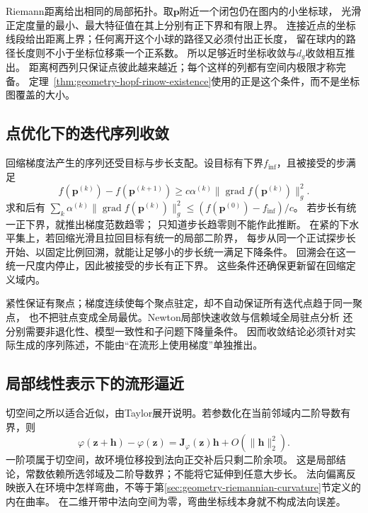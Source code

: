 Riemann距离给出相同的局部拓扑。取$\bm p$附近一个闭包仍在图内的小坐标球，
光滑正定度量的最小、最大特征值在其上分别有正下界和有限上界。
连接近点的坐标线段给出距离上界；任何离开这个小球的路径又必须付出正长度，
留在球内的路径长度则不小于坐标位移乘一个正系数。
所以足够近时坐标收敛与$d_g$收敛相互推出。
距离柯西列只保证点彼此越来越近；每个这样的列都有空间内极限才称完备。
定理~\ref{thm:geometry-hopf-rinow-existence}使用的正是这个条件，而不是坐标图覆盖的大小。

\subsection{点优化下的迭代序列收敛}
\label{sec:geometry-point-iteration-convergence}

回缩梯度法产生的序列还受目标与步长支配。设目标有下界$f_{\inf}$，且被接受的步满足
\[
 f(\bm p^{(k)})-f(\bm p^{(k+1)})\geq
 c\alpha^{(k)}\lVert\operatorname{grad}f(\bm p^{(k)})\rVert_g^2.
\]
求和后有
$\sum_k\alpha^{(k)}\lVert\operatorname{grad}f(\bm p^{(k)})\rVert_g^2
\leq(f(\bm p^{(0)})-f_{\inf})/c$。
若步长有统一正下界，就推出梯度范数趋零；
只知道步长趋零则不能作此推断。
在紧的下水平集上，若回缩光滑且拉回目标有统一的局部二阶界，
每步从同一个正试探步长开始、以固定比例回溯，就能让足够小的步长统一满足下降条件。
回溯会在这一统一尺度内停止，因此被接受的步长有正下界。
这些条件还确保更新留在回缩定义域内。

紧性保证有聚点；梯度连续使每个聚点驻定，却不自动保证所有迭代点趋于同一聚点，
也不把驻点变成全局最优。Newton局部快速收敛与信赖域全局驻点分析
还分别需要非退化性、模型一致性和子问题下降量条件。
因而收敛结论必须针对实际生成的序列陈述，不能由“在流形上使用梯度”单独推出。

\subsection{局部线性表示下的流形逼近}
\label{sec:geometry-local-linear-approximation}

切空间之所以适合近似，由Taylor展开说明。若参数化在当前邻域内二阶导数有界，则
\begin{equation}
 \varphi(\bm z+\bm h)-\varphi(\bm z)
 =\bm J_\varphi(\bm z)\bm h+O(\lVert\bm h\rVert_2^2).
 \label{eq:geometry-manifold-local-taylor}
\end{equation}
一阶项属于切空间，故环境位移投到法向正交补后只剩二阶余项。
这是局部结论，常数依赖所选邻域及二阶导数界；不能将它延伸到任意大步长。
法向偏离反映嵌入在环境中怎样弯曲，不等于第\ref{sec:geometry-riemannian-curvature}节定义的内在曲率。
在二维开带中法向空间为零，弯曲坐标线本身就不构成法向误差。


